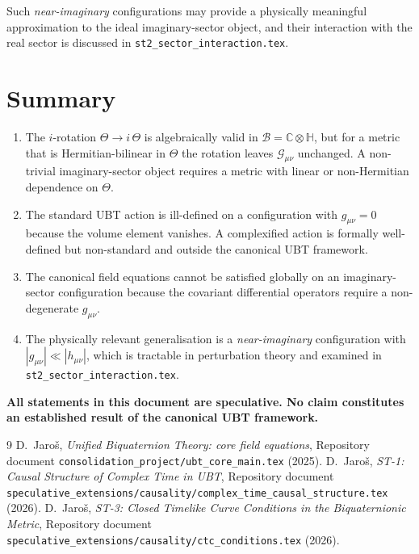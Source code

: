 \documentclass[12pt]{article}
\begin{document}
Such \emph{near-imaginary} configurations may provide a physically
meaningful approximation to the ideal imaginary-sector object,
and their interaction with the real sector is discussed in
\texttt{st2\_sector\_interaction.tex}.

\section{Summary}
\begin{enumerate}
  \item The $i$-rotation $\Theta \to i\,\Theta$ is algebraically
    valid in $\mathcal{B} = \mathbb{C}\otimes\mathbb{H}$, but for
    a metric that is Hermitian-bilinear in $\Theta$ the rotation
    leaves $\mathcal{G}_{\mu\nu}$ unchanged.  A non-trivial
    imaginary-sector object requires a metric with linear or
    non-Hermitian dependence on $\Theta$.
  \item The standard UBT action is ill-defined on a configuration
    with $g_{\mu\nu} = 0$ because the volume element vanishes.
    A complexified action is formally well-defined but non-standard
    and outside the canonical UBT framework.
  \item The canonical field equations cannot be satisfied globally
    on an imaginary-sector configuration because the covariant
    differential operators require a non-degenerate $g_{\mu\nu}$.
  \item The physically relevant generalisation is a
    \emph{near-imaginary} configuration with $|g_{\mu\nu}| \ll
    |h_{\mu\nu}|$, which is tractable in perturbation theory and
    examined in \texttt{st2\_sector\_interaction.tex}.
\end{enumerate}

\medskip
\noindent\textbf{All statements in this document are speculative.
No claim constitutes an established result of the canonical UBT framework.}


\begin{thebibliography}{9}
  D.~Jaroš,
  \emph{Unified Biquaternion Theory: core field equations},
  Repository document \texttt{consolidation\_project/ubt\_core\_main.tex} (2025).
  D.~Jaroš,
  \emph{ST-1: Causal Structure of Complex Time in UBT},
  Repository document \texttt{speculative\_extensions/causality/complex\_time\_causal\_structure.tex}
  (2026).
  D.~Jaroš,
  \emph{ST-3: Closed Timelike Curve Conditions in the Biquaternionic Metric},
  Repository document \texttt{speculative\_extensions/causality/ctc\_conditions.tex}
  (2026).
\end{thebibliography}
\end{document}
